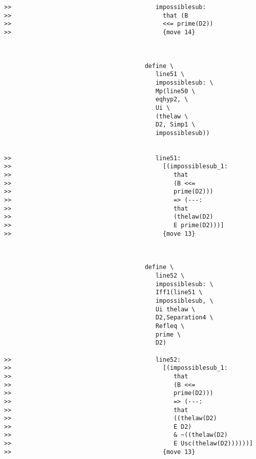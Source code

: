 \documentclass[12pt]{article}
\begin{document}
\begin{verbatim}
>>                                        impossiblesub:
>>                                          that (B
>>                                          <<= prime(D2))
>>                                          {move 14}



                                       define \
                                          line51 \
                                          impossiblesub: \
                                          Mp(line50 \
                                          eqhyp2, \
                                          Ui \
                                          (thelaw \
                                          D2, Simp1 \
                                          impossiblesub))


>>                                        line51:
>>                                          [(impossiblesub_1:
>>                                             that
>>                                             (B <<=
>>                                             prime(D2)))
>>                                             => (---:
>>                                             that
>>                                             (thelaw(D2)
>>                                             E prime(D2)))]
>>                                          {move 13}



                                       define \
                                          line52 \
                                          impossiblesub: \
                                          Iff1(line51 \
                                          impossiblesub, \
                                          Ui thelaw \
                                          D2,Separation4 \
                                          Refleq \
                                          prime \
                                          D2)

>>                                        line52:
>>                                          [(impossiblesub_1:
>>                                             that
>>                                             (B <<=
>>                                             prime(D2)))
>>                                             => (---:
>>                                             that
>>                                             ((thelaw(D2)
>>                                             E D2)
>>                                             & ~((thelaw(D2)
>>                                             E Usc(thelaw(D2))))))]
>>                                          {move 13}




\end{verbatim}
\end{document}
